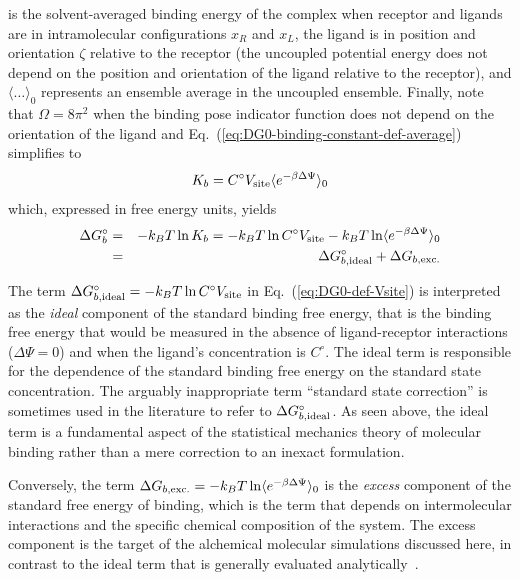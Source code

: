 \documentclass[9pt,bestpractices]{livecoms}
\begin{document}
is the solvent-averaged binding energy of the complex when receptor and ligands are in intramolecular configurations $x_R$ and $x_L$, the ligand is in position and orientation $\zeta$ relative to the receptor (the uncoupled potential energy does not depend on  the position and orientation of the ligand relative to the receptor), and $\langle \ldots \rangle_0$ represents an ensemble average in the uncoupled ensemble. Finally, note that $\Omega = 8 \pi^2$ when the binding pose indicator function does not depend on the orientation of the ligand and Eq.~(\ref{eq:DG0-binding-constant-def-average}) simplifies to
\begin{equation}\label{eq:DG0-binding-constant-def-average-noOmega}
K_b = C^\circ V_{\rm site} \langle e^{-\beta \Delta \Psi}  \rangle_0 
\end{equation}
which, expressed in free energy units, yields
\begin{eqnarray}\label{eq:DG0-def-Vsite}
  \Delta G^\circ_b &=&  - k_B T \ln K_b = - k_B T \ln C^\circ V_{\rm site} - k_B T \ln \langle e^{-\beta \Delta \Psi}  \rangle_0 \nonumber \\
{\rm \ }  &=& \Delta G^\circ_{b,{\rm ideal}} + \Delta G_{b,{\rm exc.}}
\end{eqnarray}

The term $\Delta G^\circ_{b,{\rm ideal}} = - k_B T \ln C^\circ V_{\rm site}$ in Eq.~(\ref{eq:DG0-def-Vsite}) is interpreted as the \emph{ideal} component of the standard binding free energy, that is the binding free energy that would be measured in the absence of ligand-receptor interactions ($\Delta \Psi = 0$) and when the ligand's concentration is $C^\circ$. The ideal term is responsible for the dependence of the standard binding free energy on the standard state concentration. The arguably inappropriate term ``standard state correction'' is sometimes used in the literature to refer to $\Delta G^\circ_{b,{\rm ideal}}$. As seen above, the ideal term is a fundamental aspect of the statistical mechanics theory of molecular binding rather than a mere correction to an inexact formulation. 

Conversely, the term $\Delta G_{b,{\rm exc.}} = - k_B T \ln \langle e^{-\beta \Delta \Psi}  \rangle_0 $ is the \emph{excess} component of the standard free energy of binding, which is the term that depends on intermolecular interactions and the specific chemical composition of the system. The excess component is the target of the alchemical molecular simulations discussed here, in contrast to the ideal term that is generally evaluated analytically~\cite{boresch2003absolute}.
\end{document}
